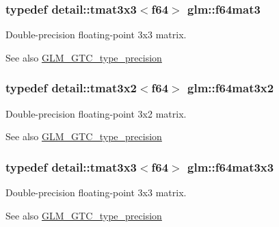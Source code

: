 \subsubsection[{f64mat3}]{\setlength{\rightskip}{0pt plus 5cm}typedef detail\+::tmat3x3$<$f64$>$ {\bf glm\+::f64mat3}}\label{group__gtc__type__precision_ga1a05ac0a6e87b279e77d877968f391bc}
Double-\/precision floating-\/point 3x3 matrix. \begin{DoxySeeAlso}{See also}
\hyperlink{group__gtc__type__precision}{G\+L\+M\+\_\+\+G\+T\+C\+\_\+type\+\_\+precision} 
\end{DoxySeeAlso}
\hypertarget{group__gtc__type__precision_gaa3edc3353425c0b14b91ebde718d5bd5}{}
\subsubsection[{f64mat3x2}]{\setlength{\rightskip}{0pt plus 5cm}typedef detail\+::tmat3x2$<$f64$>$ {\bf glm\+::f64mat3x2}}\label{group__gtc__type__precision_gaa3edc3353425c0b14b91ebde718d5bd5}
Double-\/precision floating-\/point 3x2 matrix. \begin{DoxySeeAlso}{See also}
\hyperlink{group__gtc__type__precision}{G\+L\+M\+\_\+\+G\+T\+C\+\_\+type\+\_\+precision} 
\end{DoxySeeAlso}
\hypertarget{group__gtc__type__precision_gac0fe6a1fb044122b28859feede132b75}{}
\subsubsection[{f64mat3x3}]{\setlength{\rightskip}{0pt plus 5cm}typedef detail\+::tmat3x3$<$f64$>$ {\bf glm\+::f64mat3x3}}\label{group__gtc__type__precision_gac0fe6a1fb044122b28859feede132b75}
Double-\/precision floating-\/point 3x3 matrix. \begin{DoxySeeAlso}{See also}
\hyperlink{group__gtc__type__precision}{G\+L\+M\+\_\+\+G\+T\+C\+\_\+type\+\_\+precision} 
\end{DoxySeeAlso}
\hypertarget{group__gtc__type__precision_ga41bb7ff3c269ffae270d33acb3fcfae3}{}
